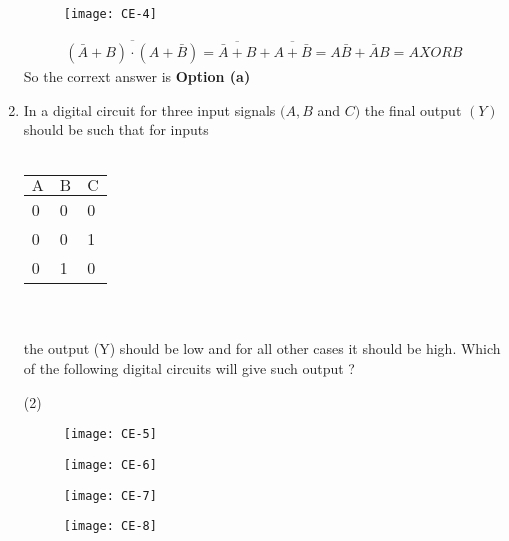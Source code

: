 \begin{enumerate}
\begin{tasks}
	\end{tasks}
	\begin{answer}$\left. \right. $\\
		\begin{figure}[H]
			\centering
			\texttt{[image: CE-4]}
		\end{figure}
		$$
		\begin{aligned}
		\overline{(\bar{A}+B) \cdot(A+\bar{B})}=\overline{\bar{A}+B}+\overline{A+\bar{B}}=A \bar{B}+\bar{A} B=A X O R B
	\end{aligned}
	$$
		So the corrext answer is \textbf{Option (a)}
	\end{answer}
	\item In a digital circuit for three input signals $(A, B$ and $C)$ the final output $(Y)$ should be such that for inputs\\\\
	\begin{tabular}{lll}
		$\mathrm{A}$ & $\mathrm{B}$ & $\mathrm{C}$ \\
		\hline 0 & 0 & 0 \\
		0 & 0 & 1 \\
		0 & 1 & 0 \\
		\hline
	\end{tabular}\\\\
	the output (Y) should be low and for all other cases it should be high. Which of the following digital circuits will give such output ?
	 \begin{tasks}(2)
		\task[\textbf{a.}]\begin{figure}[H]
			\centering
			\texttt{[image: CE-5]}
		\end{figure}
		\task[\textbf{b.}]\begin{figure}[H]
			\centering
			\texttt{[image: CE-6]}
		\end{figure}
		\task[\textbf{c.}]\begin{figure}[H]
			\centering
			\texttt{[image: CE-7]}
		\end{figure}
		\task[\textbf{d.}] \begin{figure}[H]
			\centering
			\texttt{[image: CE-8]}
		\end{figure}
	\end{tasks}
	\begin{answer}
		$$
		\begin{aligned}
		\begin{array}{c|ccc}

\end{array}
\end{aligned}$$
\end{answer}
\end{enumerate}
